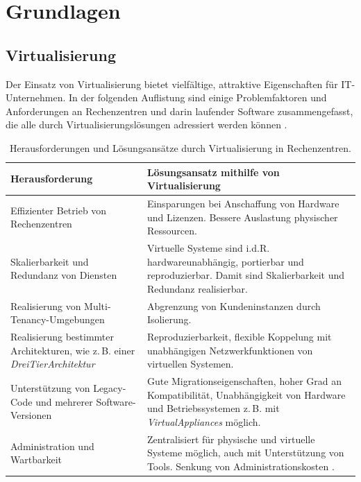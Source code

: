 \documentclass[../main.tex]{subfiles}
\begin{document}
\chapter{Grundlagen}
\label{basics}

	\section{Virtualisierung}
  \label{introVirt}
		Der Einsatz von Virtualisierung bietet vielfältige, attraktive Eigenschaften für \acrshort{IT}-Unternehmen. In der folgenden Auflistung sind einige Problemfaktoren und Anforderungen an Rechenzentren und darin laufender Software zusammengefasst, die alle durch Virtualisierungslösungen adressiert werden können \cite[S.1]{bsiVirt}\cite[S.662,672f.]{tanenbaumOS}\cite[S.299]{mandlOS}.

		\vspace{0.5cm}
		\begin{table}[h!]
			\begin{centering}
			\begin{tabularx}{\textwidth}{>{\hsize=1\hsize}X|>{\hsize=1\hsize}X}
				\hline
				\textbf{Herausforderung} & \textbf{Lösungsansatz mithilfe von Virtualisierung} \\
				\hline
				Effizienter Betrieb von Rechenzentren
				& Einsparungen bei Anschaffung von Hardware und Lizenzen. Bessere Auslastung physischer Ressourcen. \\
				\hline
				Skalierbarkeit und Redundanz von Diensten
				& Virtuelle Systeme sind i.d.R. hardwareunabhängig, portierbar und reproduzierbar. Damit sind Skalierbarkeit und Redundanz realisierbar. \\
				\hline
				Realisierung von Multi-Tenancy-Umgebungen
				& Abgrenzung von Kundeninstanzen durch Isolierung. \\
				\hline
				Realisierung bestimmter Architekturen, wie z.\,B. einer \emph{\gls{DreiTierArchitektur}}
				& Reproduzierbarkeit, flexible Koppelung mit unabhängigen Netzwerkfunktionen von virtuellen Systemen. \\
				\hline
				Unterstützung von Legacy-Code und mehrerer Software-Versionen
				& Gute Migrationseigenschaften, hoher Grad an Kompatibilität, Unabhängigkeit von Hardware und Betriebssystemen z.\,B. mit \emph{\glspl{VirtualAppliance}} möglich.\\
				\hline
				Administration und Wartbarkeit
				& Zentralisiert für physische und virtuelle Systeme möglich, auch mit Unterstützung von Tools. Senkung von Administrationskosten \cite[S.1]{bsiVirt}\cite[S.661]{tanenbaumOS}. \\
				\hline
			\end{tabularx}
			\vspace{0.5cm}
			\caption{Herausforderungen und Lösungsansätze durch Virtualisierung in Rechenzentren.}
			\label{tab:virtAdvantages}
			\end{centering}
		\end{table}
\end{document}
